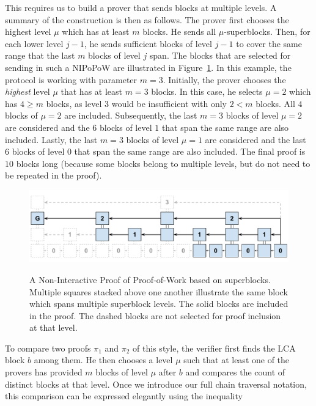 This requires us to build a prover that sends blocks at multiple levels. A
summary of the construction is then as follows. The prover first chooses the
highest level $\mu$ which has at least $m$ blocks. He sends all
$\mu$-superblocks. Then, for each lower level $j - 1$, he sends sufficient
blocks of level $j - 1$ to cover the same range that the last $m$ blocks of level
$j$ span. The blocks that are selected for sending in such a NIPoPoW are
illustrated in Figure~\ref{fig.nipopow-example}. In this example, the protocol is
working with parameter $m = 3$. Initially, the prover chooses the \emph{highest}
level $\mu$ that has at least $m = 3$ blocks. In this case, he selects $\mu = 2$
which has $4 \geq m$ blocks, as level $3$ would be insufficient with only $2 <
m$ blocks. All $4$ blocks of $\mu = 2$ are included. Subsequently, the last
$m = 3$ blocks of level $\mu = 2$ are considered and the $6$ blocks of level $1$
that span the same range are also included. Lastly, the last $m = 3$ blocks of
level $\mu = 1$ are considered and the last $6$ blocks of level $0$ that span the
same range are also included. The final proof is $10$ blocks long (because some
blocks belong to multiple levels, but do not need to be repeated in the proof).

\begin{figure}
    \caption{
      A Non-Interactive Proof of Proof-of-Work based on superblocks. Multiple
      squares stacked above one another illustrate the same block which spans
      multiple superblock levels. The solid blocks are included in the proof.
      The dashed blocks are not selected for proof inclusion at that level.
    }
    \centering
    \includegraphics[width=\columnwidth,keepaspectratio]{chapters/introduction/figures/non-interactive-popow.pdf}
    \label{fig.nipopow-example}
\end{figure}

To compare two proofs $\pi_1$ and $\pi_2$ of this style, the verifier first
finds the LCA block $b$ among them. He then chooses a level $\mu$ such that at
least one of the provers has provided $m$ blocks of level $\mu$ after $b$ and
compares the count of distinct blocks at that level. Once we introduce our full
chain traversal notation, this comparison can be expressed elegantly using the
inequality

